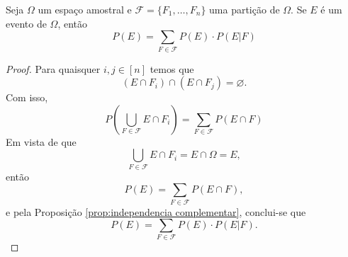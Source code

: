 \begin{thm:probabilidade total}
Seja $\Omega$ um espaço amostral e $\mathcal{F} = \{F_1, \ldots, F_n\}$ uma partição de
$\Omega$. Se $E$ é um evento de $\Omega$, então
\[
	P(E) = \sum_{F \in \mathcal{F}} P(E) \cdot P(E | F)
\]
\begin{proof}
	Para quaisquer $i, j \in [n]$ temos que
	\[
		(E \cap F_i) \cap (E \cap F_j)  = \varnothing.
	\]
	Com isso,
	\[
		P\left(\bigcup_{F \in \mathcal{F}} E \cap F_i \right) = \sum_{F \in \mathcal{F}} P(E \cap F)
	\]
	Em vista de que
	\[
		\bigcup_{F \in \mathcal{F}} E \cap F_i = E \cap \Omega = E,
	\]
	então
	\[
		P(E) = \sum_{F \in \mathcal{F}} P(E \cap F),
	\]
	e pela Proposição \ref{prop:independencia complementar}, conclui-se que
	\[
		P(E) = \sum_{F \in \mathcal{F}} P(E) \cdot P(E | F).
	\]
\end{proof}
\end{thm:probabilidade total}
